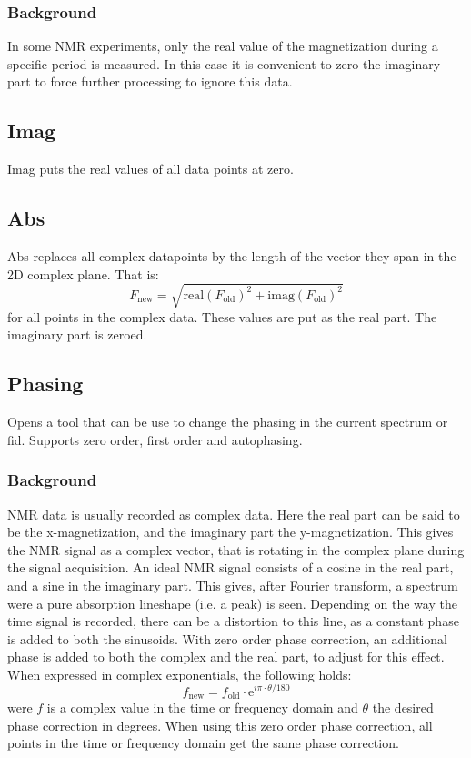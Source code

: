 \documentclass[11pt,a4paper]{article}
\begin{document}
\subsubsection*{Background}
In some NMR experiments, only the real value of the magnetization during a specific period is measured. In this case it is convenient to zero the imaginary part to force further processing to ignore this data.


\subsection{Imag}
Imag puts the real values of all data points at zero.

\subsection{Abs}
Abs replaces all complex datapoints by the length of the vector they span in the 2D complex plane. That is:
\begin{equation*}
F_\text{new} = \sqrt{\text{real}(F_\text{old})^2 + \text{imag}(F_\text{old})^2}
\end{equation*}
for all points in the complex data. These values are put as the real part. The imaginary part is zeroed.

\subsection{Phasing}
Opens a tool that can be use to change the phasing in the current spectrum or fid. Supports zero order, first order and autophasing.

\subsubsection*{Background}
NMR data is usually recorded as complex data. Here the real part can be said to be the x-magnetization, and the imaginary part the y-magnetization. This gives the NMR signal as a complex vector, that is rotating in the complex plane during the signal acquisition. An ideal NMR signal consists of a cosine in the real part, and a sine in the imaginary part. This gives, after Fourier transform, a spectrum were a pure absorption lineshape (i.e. a peak) is seen. Depending on the way the time signal is recorded, there can be a distortion to this line, as a constant phase is added to both the sinusoids. With zero order phase correction, an additional phase is added to both the complex and the real part, to adjust for this effect. When expressed in complex exponentials, the following holds:
\begin{equation}
f_\text{new} = f_\text{old}\cdot\text{e}^{i\pi\cdot\theta/180} 
\end{equation}
were $f$ is a complex value in the time or frequency domain and $\theta$ the desired phase correction in degrees. When using this zero order phase correction, all points in the time or frequency domain get the same phase correction.
\end{document}
